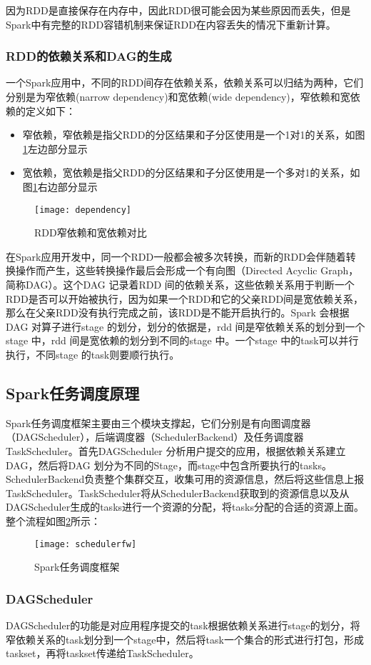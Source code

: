 因为RDD是直接保存在内存中，因此RDD很可能会因为某些原因而丢失，但是Spark中有完整的RDD容错机制来保证RDD在内容丢失的情况下重新计算。
\subsubsection{RDD的依赖关系和DAG的生成}
一个Spark应用中，不同的RDD间存在依赖关系，依赖关系可以归结为两种，它们分别是为窄依赖(narrow dependency)和宽依赖(wide dependency)，窄依赖和宽依赖的定义如下：
\begin{itemize}
\item 窄依赖，窄依赖是指父RDD的分区结果和子分区使用是一个1对1的关系，如图\ref{fig:dependency}左边部分显示
\item 宽依赖，宽依赖是指父RDD的分区结果和子分区使用是一个多对1的关系，如图\ref{fig:dependency}右边部分显示
\end{itemize}
\begin{figure}[htp]
\centering
\texttt{[image: dependency]}
\caption{RDD窄依赖和宽依赖对比}
\label{fig:dependency}
\end{figure}
在Spark应用开发中，同一个RDD一般都会被多次转换，而新的RDD会伴随着转换操作而产生，这些转换操作最后会形成一个有向图（Directed Acyclic Graph，简称DAG）。这个DAG 记录着RDD 间的依赖关系，这些依赖关系用于判断一个RDD是否可以开始被执行，因为如果一个RDD和它的父亲RDD间是宽依赖关系，那么在父亲RDD没有执行完成之前，该RDD是不能开启执行的。Spark 会根据DAG 对算子进行stage 的划分，划分的依据是，rdd 间是窄依赖关系的划分到一个stage 中，rdd 间是宽依赖的划分到不同的stage 中。一个stage 中的task可以并行执行，不同stage 的task则要顺行执行。
\subsection{Spark任务调度原理}
Spark任务调度框架主要由三个模块支撑起，它们分别是有向图调度器（DAGScheduler），后端调度器（SchedulerBackend）及任务调度器TaskScheduler。首先DAGScheduler 分析用户提交的应用，根据依赖关系建立DAG，然后将DAG 划分为不同的Stage，而stage中包含所要执行的tasks。SchedulerBackend负责整个集群交互，收集可用的资源信息，然后将这些信息上报TaskScheduler。TaskScheduler将从SchedulerBackend获取到的资源信息以及从DAGScheduler生成的tasks进行一个资源的分配，将tasks分配的合适的资源上面。整个流程如图\ref{fig:schedulerfw}所示：
\begin{figure}[htp]
\centering
\texttt{[image: schedulerfw]}
\caption{Spark任务调度框架}
\label{fig:schedulerfw}
\end{figure}
\subsubsection{DAGScheduler}
DAGScheduler的功能是对应用程序提交的task根据依赖关系进行stage的划分，将窄依赖关系的task划分到一个stage中，然后将task一个集合的形式进行打包，形成taskset，再将taskset传递给TaskScheduler。
